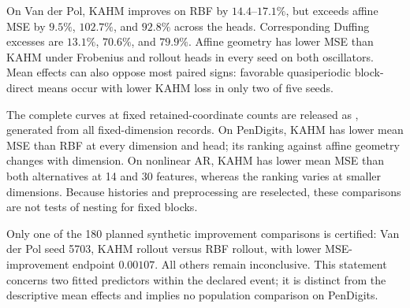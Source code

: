 On Van der Pol, KAHM improves on RBF by $14.4$--$17.1\%$, but exceeds affine
MSE by $9.5\%$, $102.7\%$, and $92.8\%$ across the heads. Corresponding
Duffing excesses are $13.1\%$, $70.6\%$, and $79.9\%$. Affine geometry has
lower MSE than KAHM under Frobenius and rollout heads in
every seed on both oscillators.
Mean effects can also oppose most paired signs: favorable quasiperiodic
block-direct means occur with lower KAHM loss in only two of five seeds.

The complete curves at fixed retained-coordinate counts are released as
, generated from all
fixed-dimension records. On PenDigits, KAHM has lower mean MSE than RBF at
every dimension and head;
its ranking against affine geometry changes with dimension. On nonlinear AR,
KAHM has lower mean MSE than both alternatives at 14 and 30 features, whereas
the ranking varies at smaller dimensions.
Because histories and preprocessing are reselected, these comparisons are
not tests of nesting for fixed blocks.

Only one of the 180 planned synthetic improvement comparisons is certified:
Van der Pol seed 5703, KAHM rollout versus RBF rollout, with lower MSE-improvement
endpoint $0.00107$. All others remain inconclusive. This statement concerns
two fitted predictors within the declared event; it is distinct from the
descriptive mean effects and implies no population comparison on PenDigits.
